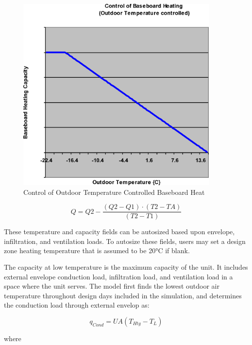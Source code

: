 \begin{figure}[hbtp] %
\centering
\includegraphics[width=0.9\textwidth, height=0.9\textheight, keepaspectratio=true]{media/image5821.png}
\caption{  Control of Outdoor Temperature Controlled Baseboard Heat \protect \label{fig:control-of-outdoor-temperature-controlled}}
\end{figure}

\begin{equation}
Q = Q2 - \frac{{(Q2 - Q1)\cdot (T2 - TA)}}{{(T2 - T1)}}
\end{equation}

These temperature and capacity fields can be autosized based upon envelope, infiltration, and ventilation loads. To autosize these fields, users may set a design zone heating temperature that is assumed to be 20°C if blank.

The capacity at low temperature is the maximum capacity of the unit. It includes external envelope conduction load, infiltration load, and ventilation load in a space where the unit serves. The model first finds the lowest outdoor air temperature throughout design days included in the simulation, and determines the conduction load through external envelop as:

\begin{equation}
{q_{Cond}} = UA\left( {{T_{Htg}} - {T_L}} \right)
\end{equation}

where

